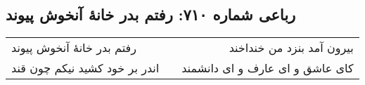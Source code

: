 \begin{center}
\section*{رباعی شماره ۷۱۰: رفتم بدر خانهٔ آنخوش پیوند}
\label{sec:0710}
\begin{longtable}{l p{0.5cm} r}
رفتم بدر خانهٔ آنخوش پیوند
&&
بیرون آمد بنزد من خنداخند
\\
اندر بر خود کشید نیکم چون قند
&&
کای عاشق و ای عارف و ای دانشمند
\\
\end{longtable}
\end{center}

